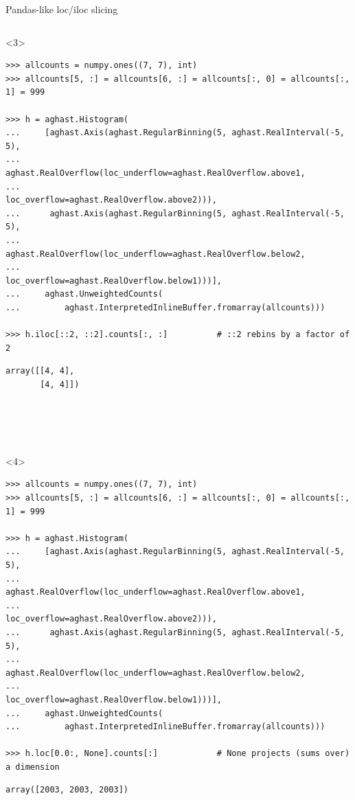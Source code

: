 \documentclass[aspectratio=169]{beamer}
\begin{document}
\begin{frame}[fragile]{Pandas-like loc/iloc slicing}
\begin{onlyenv}
\begin{verbatim}
\end{verbatim}
\end{onlyenv}
\begin{onlyenv}<3>
\begin{verbatim}
>>> allcounts = numpy.ones((7, 7), int)
>>> allcounts[5, :] = allcounts[6, :] = allcounts[:, 0] = allcounts[:, 1] = 999

>>> h = aghast.Histogram(
...     [aghast.Axis(aghast.RegularBinning(5, aghast.RealInterval(-5, 5),
...                  aghast.RealOverflow(loc_underflow=aghast.RealOverflow.above1,
...                                      loc_overflow=aghast.RealOverflow.above2))),
...      aghast.Axis(aghast.RegularBinning(5, aghast.RealInterval(-5, 5),
...                  aghast.RealOverflow(loc_underflow=aghast.RealOverflow.below2,
...                                      loc_overflow=aghast.RealOverflow.below1)))],
...     aghast.UnweightedCounts(
...         aghast.InterpretedInlineBuffer.fromarray(allcounts)))

>>> h.iloc[::2, ::2].counts[:, :]          # ::2 rebins by a factor of 2
\end{verbatim}
\begin{verbatim}
array([[4, 4], 
       [4, 4]])





\end{verbatim}
\end{onlyenv}
\begin{onlyenv}<4>
\begin{verbatim}
>>> allcounts = numpy.ones((7, 7), int)
>>> allcounts[5, :] = allcounts[6, :] = allcounts[:, 0] = allcounts[:, 1] = 999

>>> h = aghast.Histogram(
...     [aghast.Axis(aghast.RegularBinning(5, aghast.RealInterval(-5, 5),
...                  aghast.RealOverflow(loc_underflow=aghast.RealOverflow.above1,
...                                      loc_overflow=aghast.RealOverflow.above2))),
...      aghast.Axis(aghast.RegularBinning(5, aghast.RealInterval(-5, 5),
...                  aghast.RealOverflow(loc_underflow=aghast.RealOverflow.below2,
...                                      loc_overflow=aghast.RealOverflow.below1)))],
...     aghast.UnweightedCounts(
...         aghast.InterpretedInlineBuffer.fromarray(allcounts)))

>>> h.loc[0.0:, None].counts[:]            # None projects (sums over) a dimension
\end{verbatim}
\begin{verbatim}
array([2003, 2003, 2003])






\end{verbatim}
\end{onlyenv}
\end{frame}
\end{document}
